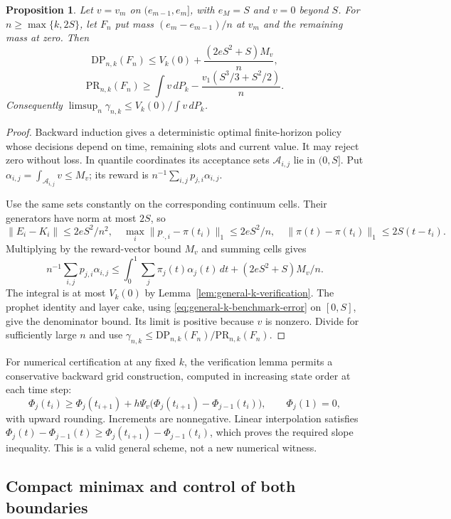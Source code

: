 \documentclass[11pt]{article}
\newtheorem{proposition}[theorem]{Proposition}
\theoremstyle{remark}
\begin{document}
\begin{proposition}\label{prop:general-k-upper-transfer}
Let $v=v_m$ on $(e_{m-1},e_m]$, with $e_M=S$ and $v=0$ beyond $S$.
For $n\ge\max\{k,2S\}$, let $F_n$ put mass
$(e_m-e_{m-1})/n$ at $v_m$ and the remaining mass at zero. Then
\[
 \mathrm{DP}_{n,k}(F_n)
 \le V_k(0)+\frac{(2eS^2+S)M_v}{n},
\]
\[
 \mathrm{PR}_{n,k}(F_n)
 \ge\int v\,dP_k-\frac{v_1(S^3/3+S^2/2)}n.
\]
Consequently $\limsup_n\gamma_{n,k}\le V_k(0)/\int v\,dP_k$.
\end{proposition}

\begin{proof}
Backward induction gives a deterministic optimal finite-horizon policy
whose decisions depend on time, remaining slots and current value.
It may reject zero without loss. In quantile coordinates its acceptance
sets $\mathcal A_{i,j}$ lie in $(0,S]$. Put
$\alpha_{i,j}=\int_{\mathcal A_{i,j}}v\le M_v$; its reward is
$n^{-1}\sum_{i,j}p_{j,i}\alpha_{i,j}$.

Use the same sets constantly on the corresponding continuum cells.
Their generators have norm at most $2S$, so
\[
 \|E_i-K_i\|\le2eS^2/n^2,
 \quad \max_i\|p_{\cdot,i}-\pi(t_i)\|_1\le2eS^2/n,
 \quad \|\pi(t)-\pi(t_i)\|_1\le2S(t-t_i).
\]
Multiplying by the reward-vector bound $M_v$ and summing cells gives
\[
 n^{-1}\sum_{i,j}p_{j,i}\alpha_{i,j}
 \le\int_0^1\sum_j\pi_j(t)\alpha_j(t)\,dt
       +(2eS^2+S)M_v/n.
\]
The integral is at most $V_k(0)$ by
Lemma~\ref{lem:general-k-verification}. The prophet identity and
layer cake, using \eqref{eq:general-k-benchmark-error} on $[0,S]$,
give the denominator bound. Its limit is positive because $v$ is
nonzero. Divide for sufficiently large $n$ and use
$\gamma_{n,k}\le\mathrm{DP}_{n,k}(F_n)/\mathrm{PR}_{n,k}(F_n)$.
\end{proof}

For numerical certification at any fixed $k$, the verification lemma
permits a conservative backward grid construction, computed in
increasing state order at each time step:
\[
 \Phi_j(t_i)\ge\Phi_j(t_{i+1})
 +h\Psi_v\bigl(\Phi_j(t_{i+1})-\Phi_{j-1}(t_i)\bigr),
 \qquad \Phi_j(1)=0,
\]
with upward rounding. Increments are nonnegative. Linear interpolation
satisfies
$\Phi_j(t)-\Phi_{j-1}(t)\ge
\Phi_j(t_{i+1})-\Phi_{j-1}(t_i)$, which proves the required slope
inequality. This is a valid general scheme, not a new numerical witness.

\subsection{Compact minimax and control of both boundaries}
\end{document}
